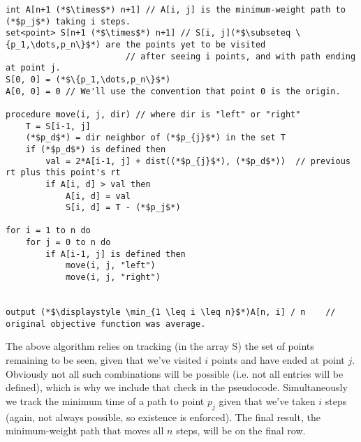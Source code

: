 \documentclass{article}
\begin{document}
\begin{lstlisting}
int A[n+1 (*$\times$*) n+1] // A[i, j] is the minimum-weight path to (*$p_j$*) taking i steps.
set<point> S[n+1 (*$\times$*) n+1] // S[i, j](*$\subseteq \{p_1,\dots,p_n\}$*) are the points yet to be visited
                        // after seeing i points, and with path ending at point j.
S[0, 0] = (*$\{p_1,\dots,p_n\}$*)
A[0, 0] = 0 // We'll use the convention that point 0 is the origin.

procedure move(i, j, dir) // where dir is "left" or "right"
    T = S[i-1, j]
    (*$p_d$*) = dir neighbor of (*$p_{j}$*) in the set T
    if (*$p_d$*) is defined then
        val = 2*A[i-1, j] + dist((*$p_{j}$*), (*$p_d$*))  // previous rt plus this point's rt
        if A[i, d] > val then
            A[i, d] = val
            S[i, d] = T - (*$p_j$*)

for i = 1 to n do
    for j = 0 to n do
        if A[i-1, j] is defined then
            move(i, j, "left")
            move(i, j, "right")


output (*$\displaystyle \min_{1 \leq i \leq n}$*)A[n, i] / n    // original objective function was average.
\end{lstlisting}

The above algorithm relies on tracking (in the array S) the set of points remaining to be seen, given that we've visited $i$ points and have ended at point $j$. Obviously not all such combinations will be possible (i.e. not all entries will be defined), which is why we include that check in the pseudocode. Simultaneously we track the minimum time of a path to point $p_j$ given that we've taken $i$ steps (again, not always possible, so existence is enforced). The final result, the minimum-weight path that moves all $n$ steps, will be on the final row.
\end{document}
